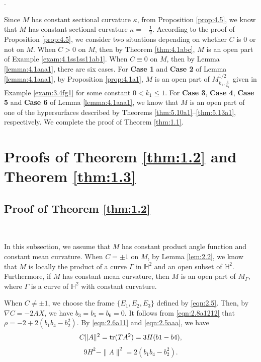 \documentclass[reqno]{amsart}%
\theoremstyle{definition}
\numberwithin{equation}{section}
\begin{document}
.

Since $M$  has  constant sectional curvature $\kappa$, from Proposition \ref{prop:4.5}, we know that $M$ has constant sectional curvature $\kappa=-\tfrac{1}{2}$. According to the proof of Proposition \ref{prop:4.5}, we consider two situations depending on whether $C$ is $0$ or not on $M$.
When $C>0$ on $M$, then by Theorem \ref{thm:4.1abc}, 
$M$ is an open part of Example \ref{exam:4.1ss1ss11ab1}.
When $C\equiv0$ on $M$, then by Lemma \ref{lemma:4.1aaa1}, there are six cases.
For {\bf Case 1} and {\bf Case 2} of Lemma \ref{lemma:4.1aaa1}, by Proposition \ref{prop:4.1a1},
$M$ is an open part of $M_{k_1,\frac{1}{k_1}}^{1/2}$ given in Example \ref{exam:3.4fg1} for some constant $0<k_1\leq1$. For {\bf Case 3}, {\bf Case 4}, {\bf Case 5} and {\bf Case 6} of Lemma \ref{lemma:4.1aaa1}, we know that $M$ is an open part of one of the hypersurfaces described by Theorems \ref{thm:5.10a1}--\ref{thm:5.13a1}, respectively. We complete the proof
of Theorem \ref{thm:1.1}.




\section{Proofs of Theorem \ref{thm:1.2} and Theorem \ref{thm:1.3}}\label{sect:6}
%
\subsection{Proof of Theorem \ref{thm:1.2}}\label{sect:6.1}~

In this subsection, we assume that $M$ has constant product angle function and
constant mean curvature.
When $C=\pm1$ on $M$, by Lemma \ref{lem:2.2}, we know that $M$ is locally the
product of a curve $\Gamma$ in $\mathbb{H}^2$ and an open
subset of $\mathbb{H}^2$. Furthermore, if $M$ has constant mean curvature,
then $M$ is an open part of $M_\Gamma$, where $\Gamma$ is a curve of $\mathbb{H}^2$ with constant curvature.

When $C\neq\pm1$, we choose the frame $\{E_1,E_2,E_3\}$ defined by \eqref{eqn:2.5}.
Then, by $\nabla C=-2 AX$, we have $b_3=b_5=b_6=0$. It follows from \eqref{eqn:2.8a1212} that
$\rho=-2+2(b_1b_4-b_2^2)$. By \eqref{eqn:2.6a11} and \eqref{eqn:2.5aaa}, we have
\begin{equation}\label{eqn:3.2a1}
C\|A\|^2={\rm tr}(TA^2)=3H(b1-b4), 
\end{equation}
\begin{equation}\label{eqn:3.2a2}
9H^2-\|A\|^2=2(b_1b_4-b_2^2).
\end{equation}
\end{document}
